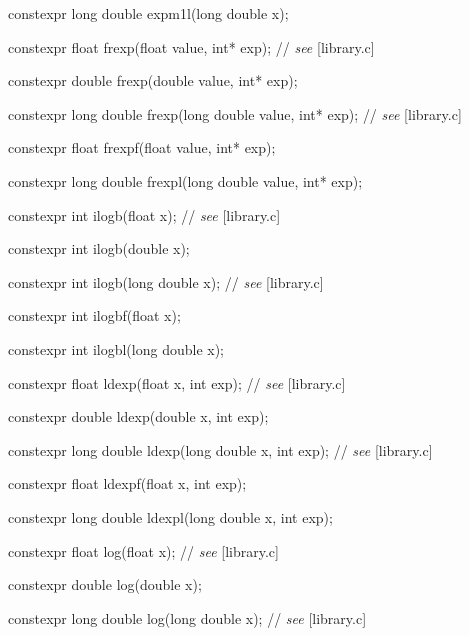 \documentclass[prd,twocolumn,amsmath,amssymb,nofootinbib,eqsecnum]{revtex4-1}
\newcommand{\highlight}[1]{{\color{green} #1}}
\newcommand{\oldhighlight}[1]{{\color{blue} #1}}
\newcommand{\stdcomment}[1]{{// {\it see} [#1]}}
\begin{document}
{\highlight{constexpr} long double expm1l(long double x);

\vspace{2ex}


\oldhighlight{constexpr}  float frexp(float value, int* exp); \stdcomment{library.c}

\oldhighlight{constexpr}  double frexp(double value, int* exp);

\oldhighlight{constexpr}  long double frexp(long double value, int* exp); \stdcomment{library.c}

\oldhighlight{constexpr}  float frexpf(float value, int* exp);

\oldhighlight{constexpr}  long double frexpl(long double value, int* exp);

\vspace{2ex}


\oldhighlight{constexpr} int ilogb(float x); \stdcomment{library.c}

\oldhighlight{constexpr} int ilogb(double x);

\oldhighlight{constexpr} int ilogb(long double x); \stdcomment{library.c}

\oldhighlight{constexpr} int ilogbf(float x);

\oldhighlight{constexpr} int ilogbl(long double x);

\vspace{2ex}


\oldhighlight{constexpr} float ldexp(float x, int exp); \stdcomment{library.c}

\oldhighlight{constexpr} double ldexp(double x, int exp);

\oldhighlight{constexpr} long double ldexp(long double x, int exp); \stdcomment{library.c}

\oldhighlight{constexpr} float ldexpf(float x, int exp);

\oldhighlight{constexpr} long double ldexpl(long double x, int exp);

\vspace{2ex}


\highlight{constexpr} float log(float x); \stdcomment{library.c}

\highlight{constexpr} double log(double x);

\highlight{constexpr} long double log(long double x); \stdcomment{library.c}

}
\end{document}
